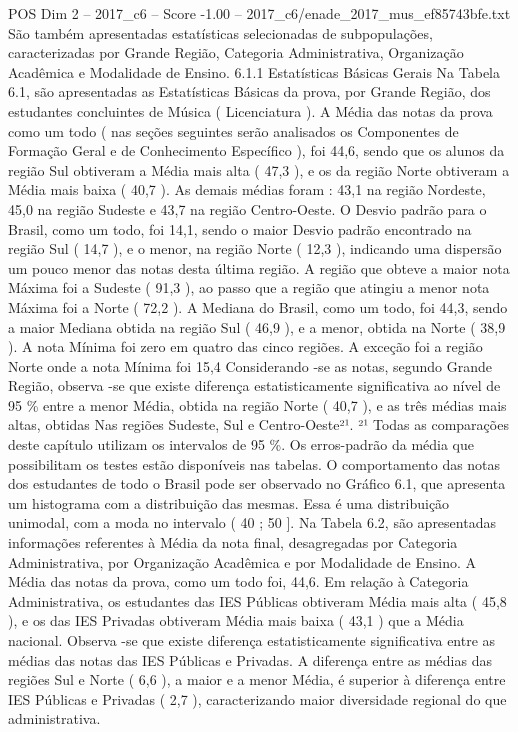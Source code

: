 \begin{textsample}{POS Dim 2 – 2017\_c6 – Score -1.00 – 2017\_c6/enade\_2017\_mus\_ef85743bfe.txt}
São também apresentadas estatísticas selecionadas de subpopulações, caracterizadas por Grande Região, Categoria Administrativa, Organização Acadêmica e Modalidade de Ensino. 6.1.1 Estatísticas Básicas Gerais Na Tabela 6.1, são apresentadas as Estatísticas Básicas da prova, por Grande Região, dos estudantes concluintes de Música ( Licenciatura ).
A Média das notas da prova como um todo ( nas seções seguintes serão analisados os Componentes de Formação Geral e de Conhecimento Específico ), foi 44,6, sendo que os alunos da região Sul obtiveram a Média mais alta ( 47,3 ), e os da região Norte obtiveram a Média mais baixa ( 40,7 ).
As demais médias foram : 43,1 na região Nordeste, 45,0 na região Sudeste e 43,7 na região Centro-Oeste.
O Desvio padrão para o Brasil, como um todo, foi 14,1, sendo o maior Desvio padrão encontrado na região Sul ( 14,7 ), e o menor, na região Norte ( 12,3 ), indicando uma dispersão um pouco menor das notas desta última região.
A região que obteve a maior nota Máxima foi a Sudeste ( 91,3 ), ao passo que a região que atingiu a menor nota Máxima foi a Norte ( 72,2 ).
A Mediana do Brasil, como um todo, foi 44,3, sendo a maior Mediana obtida na região Sul ( 46,9 ), e a menor, obtida na Norte ( 38,9 ).
A nota Mínima foi zero em quatro das cinco regiões.
A exceção foi a região Norte onde a nota Mínima foi 15,4 Considerando -se as notas, segundo Grande Região, observa -se que existe diferença estatisticamente significativa ao nível de 95 \% entre a menor Média, obtida na região Norte ( 40,7 ), e as três médias mais altas, obtidas Nas regiões Sudeste, Sul e Centro-Oeste²¹. ²¹ Todas as comparações deste capítulo utilizam os intervalos de 95 \%.
Os erros-padrão da média que possibilitam os testes estão disponíveis nas tabelas.
O comportamento das notas dos estudantes de todo o Brasil pode ser observado no Gráfico 6.1, que apresenta um histograma com a distribuição das mesmas.
Essa é uma distribuição unimodal, com a moda no intervalo ( 40 ; 50 ].
Na Tabela 6.2, são apresentadas informações referentes à Média da nota final, desagregadas por Categoria Administrativa, por Organização Acadêmica e por Modalidade de Ensino.
A Média das notas da prova, como um todo foi, 44,6.
Em relação à Categoria Administrativa, os estudantes das IES Públicas obtiveram Média mais alta ( 45,8 ), e os das IES Privadas obtiveram Média mais baixa ( 43,1 ) que a Média nacional.
Observa -se que existe diferença estatisticamente significativa entre as médias das notas das IES Públicas e Privadas.
A diferença entre as médias das regiões Sul e Norte ( 6,6 ), a maior e a menor Média, é superior à diferença entre IES Públicas e Privadas ( 2,7 ), caracterizando maior diversidade regional do que administrativa.

\end{textsample}
